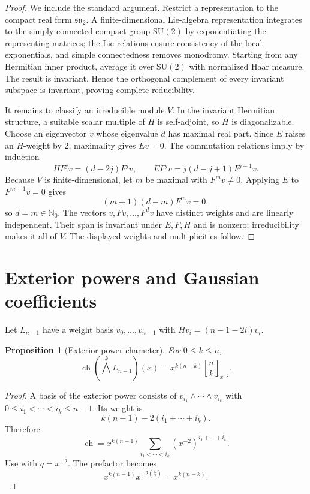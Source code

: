 \documentclass[11pt,oneside,openany]{book}
\newtheorem{proposition}[proposition]{Proposition}
\theoremstyle{definition}
\theoremstyle{remark}
\newcommand{\Qbinom}[3]{\genfrac{[}{]}{0pt}{}{#1}{#2}_{#3}}
\newcommand{\N}{\mathbb N}
\newcommand{\ch}{\operatorname{ch}}
\begin{document}
\begin{proof}
We include the standard argument.  Restrict a representation to the compact real form $\mathfrak{su}_2$.  A finite-dimensional Lie-algebra representation integrates to the simply connected compact group $\mathrm{SU}(2)$ by exponentiating the representing matrices; the Lie relations ensure consistency of the local exponentials, and simple connectedness removes monodromy.  Starting from any Hermitian inner product, average it over $\mathrm{SU}(2)$ with normalized Haar measure.  The result is invariant.  Hence the orthogonal complement of every invariant subspace is invariant, proving complete reducibility.

It remains to classify an irreducible module $V$.  In the invariant Hermitian structure, a suitable scalar multiple of $H$ is self-adjoint, so $H$ is diagonalizable.  Choose an eigenvector $v$ whose eigenvalue $d$ has maximal real part.  Since $E$ raises an $H$-weight by $2$, maximality gives $Ev=0$.  The commutation relations imply by induction
\[
 H F^jv=(d-2j)F^jv,
 \qquad
 E F^jv=j(d-j+1)F^{j-1}v.
\]
Because $V$ is finite-dimensional, let $m$ be maximal with $F^mv\ne0$.  Applying $E$ to $F^{m+1}v=0$ gives
\[
 (m+1)(d-m)F^mv=0,
\]
so $d=m\in\N_0$.  The vectors $v,Fv,\dots,F^dv$ have distinct weights and are linearly independent.  Their span is invariant under $E,F,H$ and is nonzero; irreducibility makes it all of $V$.  The displayed weights and multiplicities follow.
\end{proof}

\section{Exterior powers and Gaussian coefficients}

Let $L_{n-1}$ have a weight basis $v_0,\dots,v_{n-1}$ with
\(
 Hv_i=(n-1-2i)v_i.
\)

\begin{proposition}[Exterior-power character]\label{prop:exterior-character}
For $0\le k\le n$,
\[
 \ch\!\left(\bigwedge^kL_{n-1}\right)(x)
 =x^{k(n-k)}\Qbinom nk{x^{-2}}.
\]
\end{proposition}

\begin{proof}
A basis of the exterior power consists of
\(
 v_{i_1}\wedge\cdots\wedge v_{i_k}
\)
with $0\le i_1<\cdots<i_k\le n-1$.  Its weight is
\[
 k(n-1)-2(i_1+\cdots+i_k).
\]
Therefore
\[
 \ch=x^{k(n-1)}
 \sum_{i_1<\cdots<i_k}(x^{-2})^{i_1+\cdots+i_k}.
\]
Use  with $q=x^{-2}$.  The prefactor becomes
\[
 x^{k(n-1)}x^{-2\binom k2}=x^{k(n-k)}.
\]
\end{proof}
\end{document}
